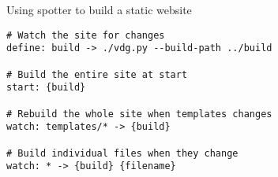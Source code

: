 \documentclass{beamer}
\begin{document}
\begin{frame}[fragile]{Using spotter to build a static website}
\begin{verbatim}
# Watch the site for changes
define: build -> ./vdg.py --build-path ../build

# Build the entire site at start
start: {build}

# Rebuild the whole site when templates changes
watch: templates/* -> {build}

# Build individual files when they change
watch: * -> {build} {filename}
\end{verbatim}
\end{frame}

\begin{frame}
    \titlepage
\end{frame}
\end{document}
